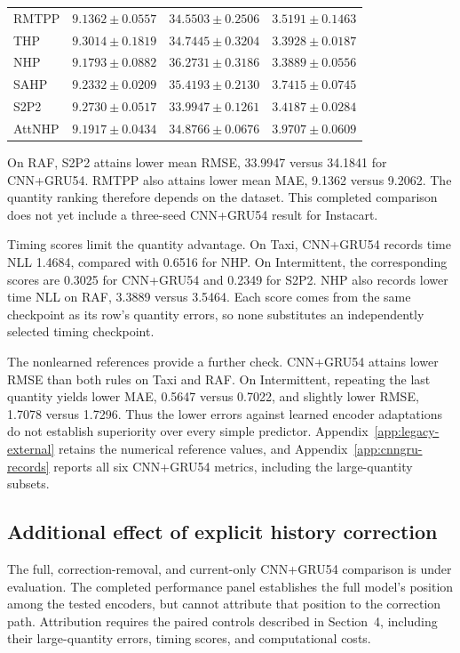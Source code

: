 \documentclass[runningheads]{llncs}
\begin{document}
\begin{table}[t]
\begin{tabular}{@{}lrrr@{}}
RMTPP & $\mathbf{9.1362\pm0.0557}$ & $34.5503\pm0.2506$ & $3.5191\pm0.1463$\\
THP & $9.3014\pm0.1819$ & $34.7445\pm0.3204$ & $3.3928\pm0.0187$\\
NHP & $9.1793\pm0.0882$ & $36.2731\pm0.3186$ & $\mathbf{3.3889\pm0.0556}$\\
SAHP & $9.2332\pm0.0209$ & $35.4193\pm0.2130$ & $3.7415\pm0.0745$\\
S2P2 & $9.2730\pm0.0517$ & $\mathbf{33.9947\pm0.1261}$ & $3.4187\pm0.0284$\\
AttNHP & $9.1917\pm0.0434$ & $34.8766\pm0.0676$ & $3.9707\pm0.0609$\\
\bottomrule
\end{tabular}
\end{table}

On RAF, S2P2 attains lower mean RMSE, 33.9947 versus 34.1841 for CNN+GRU54. RMTPP also attains lower mean MAE, 9.1362 versus 9.2062. The quantity ranking therefore depends on the dataset. This completed comparison does not yet include a three-seed CNN+GRU54 result for Instacart.

Timing scores limit the quantity advantage. On Taxi, CNN+GRU54 records time NLL 1.4684, compared with 0.6516 for NHP. On Intermittent, the corresponding scores are 0.3025 for CNN+GRU54 and 0.2349 for S2P2. NHP also records lower time NLL on RAF, 3.3889 versus 3.5464. Each score comes from the same checkpoint as its row's quantity errors, so none substitutes an independently selected timing checkpoint.

The nonlearned references provide a further check. CNN+GRU54 attains lower RMSE than both rules on Taxi and RAF. On Intermittent, repeating the last quantity yields lower MAE, 0.5647 versus 0.7022, and slightly lower RMSE, 1.7078 versus 1.7296. Thus the lower errors against learned encoder adaptations do not establish superiority over every simple predictor. Appendix~\ref{app:legacy-external} retains the numerical reference values, and Appendix~\ref{app:cnngru-records} reports all six CNN+GRU54 metrics, including the large-quantity subsets.

\subsection{Additional effect of explicit history correction}
The full, correction-removal, and current-only CNN+GRU54 comparison is under evaluation. The completed performance panel establishes the full model's position among the tested encoders, but cannot attribute that position to the correction path. Attribution requires the paired controls described in Section~4, including their large-quantity errors, timing scores, and computational costs.
\end{document}
